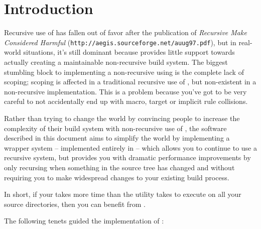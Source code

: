 \chapter{Introduction}

Recursive use of \make has fallen out of favor after the publication
of \emph{Recursive Make Considered Harmful}
(\texttt{http://aegis.sourceforge.net/auug97.pdf}), but in real-world
situations, it's still dominant because \make provides little support
towards actually creating a maintainable non-recursive build system.
The biggest stumbling block to implementing a non-recursive using
\make is the complete lack of scoping; scoping is affected in a
traditional recursive use of \make, but non-existent in a
non-recursive implementation.  This is a problem because you've got to
be very careful to not accidentally end up with macro, target or
implicit rule collisions.

Rather than trying to change the world by convincing people to
increase the complexity of their build system with non-recursive use
of \make, the software described in this document aims to simplify the
world by implementing a wrapper system -- implemented entirely in
\gnumake -- which allows you to continue to use a recursive \make
system, but provides you with dramatic performance improvements by
only recursing when something in the source tree has changed and
without requiring you to make widespread changes to your existing
build process.

In short, if your \nullbuild takes more time than the \mtree utility
takes to execute on all your source directories, then you can benefit
from \lmsbw.

The following tenets guided the implementation of \lmsbw:


